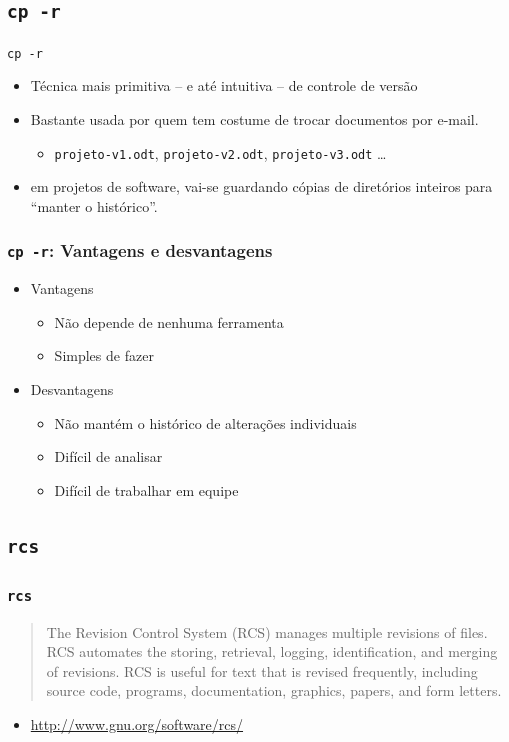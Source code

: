 \documentclass{beamer}
\newcommand{\cpr}{\texttt{cp -r}}
\newcommand{\rcs}{\texttt{rcs}}
\begin{document}
\subsection{\cpr}

\begin{frame}{\cpr}
  \begin{itemize}
    \item Técnica mais primitiva -- e até intuitiva -- de controle de versão
    \item Bastante usada por quem tem costume de trocar documentos por
      e-mail.
      \begin{itemize}
        \item \texttt{projeto-v1.odt}, \texttt{projeto-v2.odt},
          \texttt{projeto-v3.odt} \ldots
      \end{itemize}
    \item em projetos de software, vai-se guardando cópias de diretórios
      inteiros para ``manter o histórico''.
  \end{itemize}
\end{frame}

\begin{frame}
  \frametitle{\cpr: Vantagens e desvantagens}
  \begin{itemize}
    \item Vantagens
      \begin{itemize}
        \item Não depende de nenhuma ferramenta
        \item Simples de fazer
      \end{itemize}
    \item Desvantagens
      \begin{itemize}
        \item Não mantém o histórico de alterações individuais
        \item Difícil de analisar
        \item Difícil de trabalhar em equipe
      \end{itemize}
  \end{itemize}
\end{frame}

\subsection{\rcs}

\begin{frame}
  \frametitle{\rcs}
  \begin{quote}
    The Revision Control System (RCS) manages multiple revisions of
    files. RCS automates the storing, retrieval, logging,
    identification, and merging of revisions. RCS is useful for text
    that is revised frequently, including source code, programs,
    documentation, graphics, papers, and form letters.
  \end{quote}

  \begin{itemize}
    \item \url{http://www.gnu.org/software/rcs/}
  \end{itemize}
\end{frame}
\end{document}
